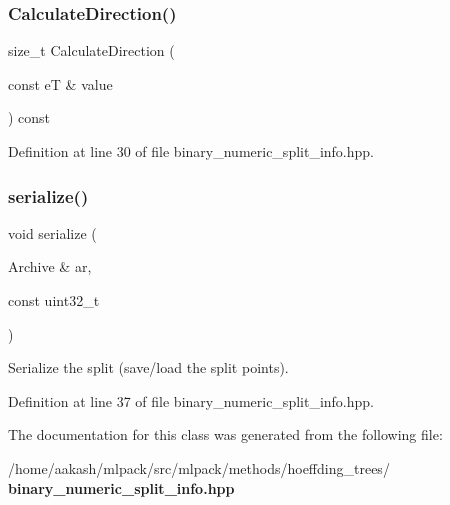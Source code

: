 \subsubsection{Calculate\+Direction()}
{\footnotesize\ttfamily size\+\_\+t Calculate\+Direction (\begin{DoxyParamCaption}\item[{const eT \&}]{value }\end{DoxyParamCaption}) const\hspace{0.3cm}{\ttfamily [inline]}}



Definition at line 30 of file binary\+\_\+numeric\+\_\+split\+\_\+info.\+hpp.

\mbox{\label{classmlpack_1_1tree_1_1BinaryNumericSplitInfo_a65cba07328997659bec80b9879b15a51}} 
\subsubsection{serialize()}
{\footnotesize\ttfamily void serialize (\begin{DoxyParamCaption}\item[{Archive \&}]{ar,  }\item[{const uint32\+\_\+t}]{ }\end{DoxyParamCaption})\hspace{0.3cm}{\ttfamily [inline]}}



Serialize the split (save/load the split points). 



Definition at line 37 of file binary\+\_\+numeric\+\_\+split\+\_\+info.\+hpp.



The documentation for this class was generated from the following file\+:\begin{DoxyCompactItemize}
\item 
/home/aakash/mlpack/src/mlpack/methods/hoeffding\+\_\+trees/\textbf{ binary\+\_\+numeric\+\_\+split\+\_\+info.\+hpp}\end{DoxyCompactItemize}
